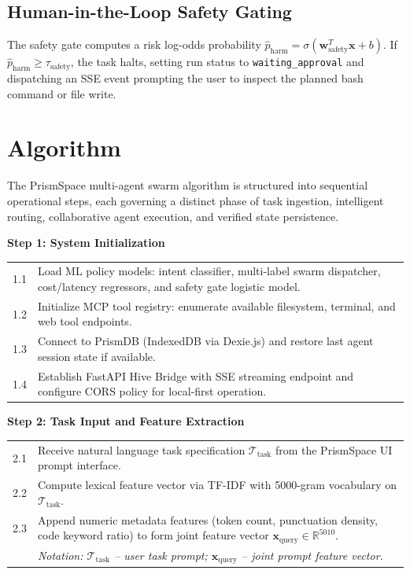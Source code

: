 \documentclass[12pt,a4paper]{report}
\begin{document}
\subsection{Human-in-the-Loop Safety Gating}
The safety gate computes a risk log-odds probability $\hat{p}_{\text{harm}} = \sigma(\mathbf{w}_{\text{safety}}^T \mathbf{x} + b)$. If $\hat{p}_{\text{harm}} \ge \tau_{\text{safety}}$, the task halts, setting run status to \texttt{waiting\_approval} and dispatching an SSE event prompting the user to inspect the planned bash command or file write.

\section{Algorithm}
The PrismSpace multi-agent swarm algorithm is structured into sequential operational steps, each governing a distinct phase of task ingestion, intelligent routing, collaborative agent execution, and verified state persistence.

\vspace{6pt}
\noindent\textbf{Step 1: System Initialization}
\vspace{4pt}

\noindent\begin{tabular}{p{1cm} p{12.5cm}}
1.1 & Load ML policy models: intent classifier, multi-label swarm dispatcher, cost/latency regressors, and safety gate logistic model. \\
1.2 & Initialize MCP tool registry: enumerate available filesystem, terminal, and web tool endpoints. \\
1.3 & Connect to PrismDB (IndexedDB via Dexie.js) and restore last agent session state if available. \\
1.4 & Establish FastAPI Hive Bridge with SSE streaming endpoint and configure CORS policy for local-first operation. \\
\end{tabular}

\clearpage
\noindent\textbf{Step 2: Task Input and Feature Extraction}
\vspace{4pt}

\noindent\begin{tabular}{p{1cm} p{12.5cm}}
2.1 & Receive natural language task specification $\mathcal{T}_{\text{task}}$ from the PrismSpace UI prompt interface. \\
2.2 & Compute lexical feature vector via TF-IDF with 5000-gram vocabulary on $\mathcal{T}_{\text{task}}$. \\
2.3 & Append numeric metadata features (token count, punctuation density, code keyword ratio) to form joint feature vector $\mathbf{x}_{\text{query}} \in \mathbb{R}^{5010}$. \\
 & \textit{Notation: $\mathcal{T}_{\text{task}}$ -- user task prompt; $\mathbf{x}_{\text{query}}$ -- joint prompt feature vector.} \\
\end{tabular}
\end{document}
